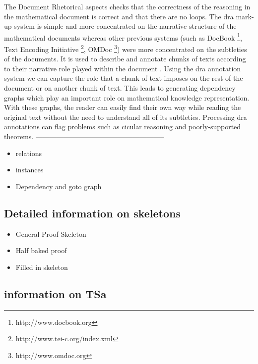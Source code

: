The Document Rhetorical aspects checks that the correctness of the reasoning in the mathematical document is correct and that there are no loops. The \gls{dra} mark-up system is simple and more concentrated on the narrative structure of the mathematical documents whereas other previous systems (such as DocBook \footnote{http://www.docbook.org}, Text Encoding Initiative \footnote{http://www.tei-c.org/index.xml}, OMDoc \footnote{http://www.omdoc.org}) were more concentrated on  the subtleties of the documents. It is used to describe and annotate chunks of texts according to their narrative role played within the document \cite{krzysztofphd}. Using the \gls{dra} annotation system we can capture the role that a chunk of text imposes on the rest of the document or on another chunk of text. This leads to generating dependency graphs which play an important role on mathematical knowledge representation. With these graphs, the reader can easily find their own way while reading the original text without the need to understand all of its subtleties. Processing \gls{dra} annotations can flag problems such as cicular reasoning and poorly-supported theorems.
--------------------------------------------------------

\begin{itemize}
\item relations

\item instances

\item Dependency and goto graph
\end{itemize}

\subsection{Detailed information on skeletons}

\begin{itemize}
\item General Proof Skeleton

\item Half baked proof

\item Filled in skeleton
\end{itemize}

\subsection{information on TSa}
\label{subsec:tsa}

